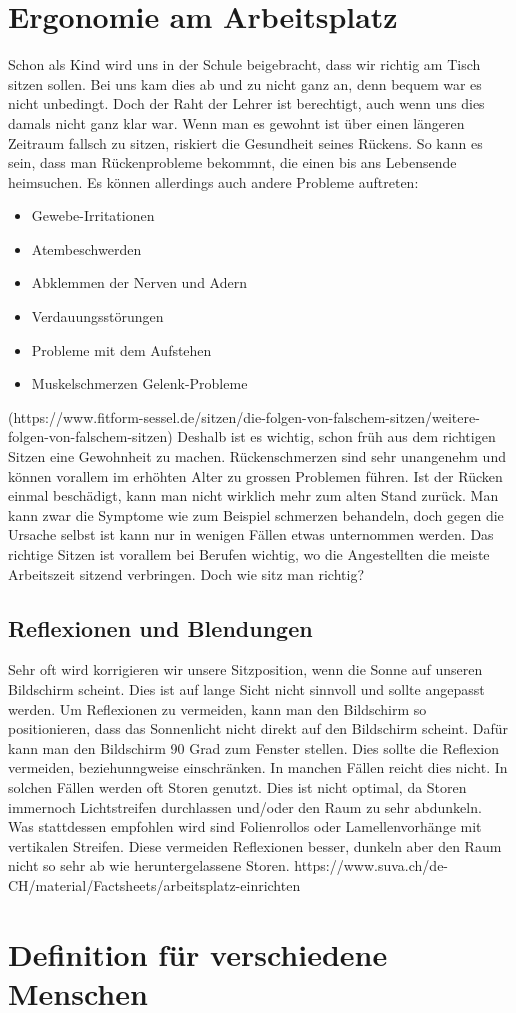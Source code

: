 \section{Ergonomie am Arbeitsplatz}
Schon als Kind wird uns in der Schule beigebracht, dass wir richtig am Tisch sitzen sollen. Bei uns kam dies ab und zu nicht ganz an, denn bequem war es nicht unbedingt.
\newline
Doch der Raht der Lehrer ist berechtigt, auch wenn uns dies damals nicht ganz klar war. Wenn man es gewohnt ist über einen längeren Zeitraum fallsch zu sitzen, riskiert die Gesundheit seines Rückens. So kann es sein, dass man Rückenprobleme bekommnt, die einen bis ans Lebensende heimsuchen.
\newline
\newline
Es können allerdings auch andere Probleme auftreten:
\begin{itemize}
  \item Gewebe-Irritationen
  \item Atembeschwerden
  \item Abklemmen der Nerven und Adern
  \item Verdauungsstörungen
  \item Probleme mit dem Aufstehen
  \item Muskelschmerzen Gelenk-Probleme
\end{itemize}
(https://www.fitform-sessel.de/sitzen/die-folgen-von-falschem-sitzen/weitere-folgen-von-falschem-sitzen)
\newline
Deshalb ist es wichtig, schon früh aus dem richtigen Sitzen eine Gewohnheit zu machen. Rückenschmerzen sind sehr unangenehm und können vorallem im erhöhten Alter zu grossen Problemen führen. Ist der Rücken einmal beschädigt, kann man nicht wirklich mehr zum alten Stand zurück. Man kann zwar die Symptome wie zum Beispiel schmerzen behandeln, doch gegen die Ursache selbst ist kann nur in wenigen Fällen etwas unternommen werden.
\newline
Das richtige Sitzen ist vorallem bei Berufen wichtig, wo die Angestellten die meiste Arbeitszeit sitzend verbringen. 
\newline
Doch wie sitz man richtig?
\subsection{Reflexionen und Blendungen}
Sehr oft wird korrigieren wir unsere Sitzposition, wenn die Sonne auf unseren Bildschirm scheint. Dies ist auf lange Sicht nicht sinnvoll und sollte angepasst werden. Um Reflexionen zu vermeiden, kann man den Bildschirm so positionieren, dass das Sonnenlicht nicht direkt auf den Bildschirm scheint. Dafür kann man den Bildschirm 90 Grad zum Fenster stellen. Dies sollte die Reflexion vermeiden, beziehunngweise einschränken.
\newline
In manchen Fällen reicht dies nicht. In solchen Fällen werden oft Storen genutzt. Dies ist nicht optimal, da Storen immernoch Lichtstreifen durchlassen und/oder den Raum zu sehr abdunkeln. Was stattdessen empfohlen wird sind Folienrollos oder Lamellenvorhänge mit vertikalen Streifen. Diese vermeiden Reflexionen besser, dunkeln aber den Raum nicht so sehr ab wie heruntergelassene Storen.
https://www.suva.ch/de-CH/material/Factsheets/arbeitsplatz-einrichten
\section{Definition für verschiedene Menschen}